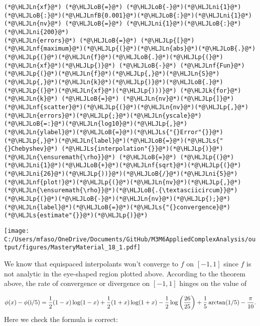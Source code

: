 \documentclass[12pt,a4paper]{article}
\newcommand{\HLJLk}[1]{\textcolor[RGB]{148,91,176}{\textbf{#1}}}
\newcommand{\HLJLn}[1]{#1}
\newcommand{\HLJLnf}[1]{\textcolor[RGB]{66,102,213}{#1}}
\newcommand{\HLJLs}[1]{\textcolor[RGB]{201,61,57}{#1}}
\newcommand{\HLJLnfB}[1]{\textcolor[RGB]{59,151,46}{#1}}
\newcommand{\HLJLni}[1]{\textcolor[RGB]{59,151,46}{#1}}
\newcommand{\HLJLoB}[1]{\textcolor[RGB]{102,102,102}{\textbf{#1}}}
\newcommand{\HLJLp}[1]{#1}
\def\I{ {\rm i} }
\begin{document}
\begin{lstlisting}
(*@\HLJLn{xf}@*) (*@\HLJLoB{=}@*) (*@\HLJLoB{-}@*)(*@\HLJLni{1}@*)(*@\HLJLoB{:}@*)(*@\HLJLnfB{0.001}@*)(*@\HLJLoB{:}@*)(*@\HLJLni{1}@*)
(*@\HLJLn{nv}@*) (*@\HLJLoB{=}@*) (*@\HLJLni{1}@*)(*@\HLJLoB{:}@*)(*@\HLJLni{200}@*)
(*@\HLJLn{errors}@*) (*@\HLJLoB{=}@*) (*@\HLJLp{[}@*)(*@\HLJLnf{maximum}@*)(*@\HLJLp{(}@*)(*@\HLJLn{abs}@*)(*@\HLJLoB{.}@*)(*@\HLJLp{(}@*)(*@\HLJLn{f}@*)(*@\HLJLoB{.}@*)(*@\HLJLp{(}@*)(*@\HLJLn{xf}@*)(*@\HLJLp{)}@*) (*@\HLJLoB{-}@*) (*@\HLJLnf{Fun}@*)(*@\HLJLp{(}@*)(*@\HLJLn{f}@*)(*@\HLJLp{,}@*)(*@\HLJLn{S}@*)(*@\HLJLp{,}@*)(*@\HLJLn{k}@*)(*@\HLJLp{)}@*)(*@\HLJLoB{.}@*)(*@\HLJLp{(}@*)(*@\HLJLn{xf}@*)(*@\HLJLp{)))}@*) (*@\HLJLk{for}@*) (*@\HLJLn{k}@*) (*@\HLJLoB{=}@*) (*@\HLJLn{nv}@*)(*@\HLJLp{]}@*)
(*@\HLJLnf{scatter}@*)(*@\HLJLp{(}@*)(*@\HLJLn{nv}@*)(*@\HLJLp{,}@*)(*@\HLJLn{errors}@*)(*@\HLJLp{;}@*)(*@\HLJLn{yscale}@*)(*@\HLJLoB{=:}@*)(*@\HLJLn{log10}@*)(*@\HLJLp{,}@*)(*@\HLJLn{ylabel}@*)(*@\HLJLoB{=}@*)(*@\HLJLs{"{}Error"{}}@*)(*@\HLJLp{,}@*)(*@\HLJLn{label}@*)(*@\HLJLoB{=}@*)(*@\HLJLs{"{}Chebyshev}@*) (*@\HLJLs{interpolation"{}}@*)(*@\HLJLp{)}@*)
(*@\HLJLn{\ensuremath{\rho}}@*) (*@\HLJLoB{=}@*) (*@\HLJLp{(}@*)(*@\HLJLni{1}@*)(*@\HLJLoB{+}@*)(*@\HLJLnf{sqrt}@*)(*@\HLJLp{(}@*)(*@\HLJLni{26}@*)(*@\HLJLp{))}@*)(*@\HLJLoB{/}@*)(*@\HLJLni{5}@*)
(*@\HLJLnf{plot!}@*)(*@\HLJLp{(}@*)(*@\HLJLn{nv}@*)(*@\HLJLp{,}@*)(*@\HLJLn{\ensuremath{\rho}}@*)(*@\HLJLoB{.{\textasciicircum}}@*)(*@\HLJLp{(}@*)(*@\HLJLoB{-}@*)(*@\HLJLn{nv}@*)(*@\HLJLp{);}@*)(*@\HLJLn{label}@*)(*@\HLJLoB{=}@*)(*@\HLJLs{"{}convergence}@*) (*@\HLJLs{estimate"{}}@*)(*@\HLJLp{)}@*)
\end{lstlisting}

\texttt{[image: C:/Users/mfaso/OneDrive/Documents/GitHub/M3M6AppliedComplexAnalysis/output/figures/MasteryMaterial\_18\_1.pdf]}

We know that equispaced interpolants won't converge to $f$ on $[-1, 1]$ since $f$ is not analytic in the eye-shaped region plotted above. According to the theorem above, the rate of convergence or divergence on $[-1, 1]$ hinges on the value of

\[
\phi(x) - \phi(\I/5) = {1\over 2}(1-x) \log(1-x) +  {1\over 2}(1+x) \log(1+x) - {1\over 2}\log\left({26\over25}\right)+{1\over5}\arctan(1/5)-{\pi\over10}.
\]
Here we check the formula is correct:
\end{document}
